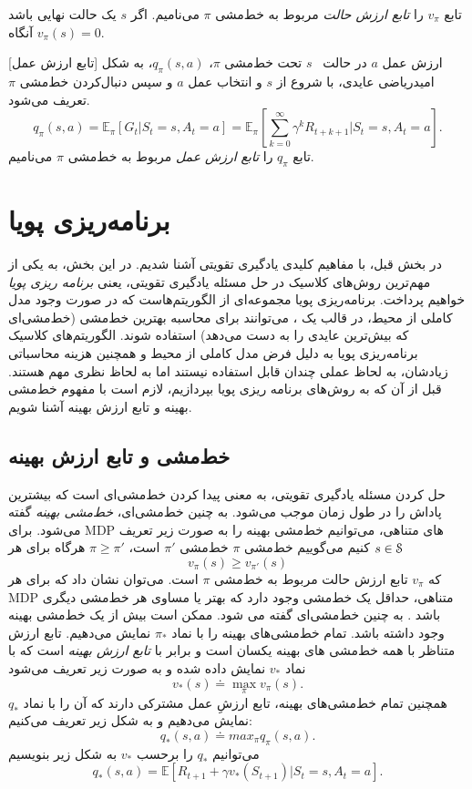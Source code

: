تابع $v_\pi$ را 
\textit{تابع ارزش حالت} مربوط به خط‌مشی 
$\pi$
می‌نامیم. اگر $s$ یک حالت نهایی باشد آنگاه 
$v_\pi(s) = 0$.


\label{statevaluedef}

[تابع ارزش عمل]
ارزش عمل  $a$ در حالت
\ $s$
 تحت خط‌مشی 
$\pi$،
$q_\pi(s,a)$،
  به شکل امیدریاضی عایدی، با شروع از $s$ و انتخاب عمل $a$  و سپس دنبال‌کردن خط‌مشی $\pi$ تعریف می‌شود.
$$q_\pi(s,a) = \mathbb{E}_\pi\left[G_t| S_t=s, A_t=a\right] = \mathbb{E}_\pi\left[\sum_{k=0}^{\infty} \gamma^k R_{t+k+1}|S_t =s, A_t=a \right].$$
تابع $q_\pi$ را 
\textit{تابع ارزش عمل}
 مربوط به خط‌مشی 
$\pi$
می‌نامیم.
\section{برنامه‌ریزی پویا}
در بخش قبل، با مفاهیم کلیدی یادگیری تقویتی آشنا شدیم. در این بخش، به یکی از مهم‌ترین روش‌های کلاسیک در حل مسئله یادگیری تقویتی، یعنی 
\textit{برنامه ریزی پویا}
خواهیم پرداخت. برنامه‌ریزی پویا
 مجموعه‌ای از الگوریتم‌هاست  که در صورت وجود مدل کاملی از محیط، در قالب یک 
،
 می‌توانند برای محاسبه بهترین خط‌مشی (خط‌مشی‌ای که بیش‌ترین عایدی را به دست می‌دهد) استفاده شوند.
الگوریتم‌های کلاسیک برنامه‌ریزی پویا به دلیل فرض
مدل کاملی از محیط و همچنین هزینه محاسباتی زیادشان، به لحاظ عملی چندان قابل استفاده نیستند اما به لحاظ نظری مهم هستند. قبل از آن که به روش‌های برنامه ریزی پویا بپردازیم، لازم است با مفهوم خط‌مشی بهینه و تابع ارزش بهینه آشنا شویم.
\subsection{خط‌مشی و تابع ارزش بهینه}
حل کردن مسئله یادگیری تقویتی، به معنی پیدا کردن خط‌مشی‌ای است که بیشترین پاداش را در طول زمان موجب می‌شود.	به چنین خط‌مشی‌ای، 
\textit{خط‌مشی بهینه} 
گفته می‌شود. برای
 MDP‌ 
 های متناهی، می‌توانیم خط‌مشی بهینه را به صورت زیر تعریف کنیم
می‌گوییم خط‌مشی $\pi$  خط‌مشی 
$\pi'$
است،
$\pi \ge \pi'$
هرگاه برای هر 
$s \in \EuScript{S}$
$$v_\pi(s) \ge v_{\pi'}(s)$$
که $v_\pi$ تابع ارزش حالت مربوط به خط‌مشی $\pi$ است.
 می‌توان نشان داد که برای هر MDP متناهی، حداقل یک خط‌مشی وجود دارد که بهتر یا مساوی هر خط‌مشی دیگری باشد
\cite{suttonbook}.
 به چنین خط‌مشی‌ای 
\textit{}
 گفته می‌ شود. ممکن است بیش از یک خط‌مشی بهینه وجود داشته باشد. تمام خط‌مشی‌های بهینه را با نماد $\pi_*$  نمایش می‌دهیم. تابع ارزش متناظر با همه خط‌مشی\nf
های بهینه یکسان است و برابر با 
\textit{تابع ارزش بهینه}
 است که با نماد $v_*$ نمایش داده شده و به صورت زیر تعریف می‌شود
$$v_*(s) \doteq \max_{\pi} v_\pi(s).$$
همچنین تمام خط‌مشی‌‌های بهینه، تابع ارزشِ عمل مشترکی دارند که آن را با نماد $q_*$ نمایش می‌دهیم و به شکل زیر تعریف می‌کنیم:
$$q_*(s,a) \doteq max_{\pi} q_\pi(s,a).$$
می‌توانیم $q_*$ را برحسب $v_*$ به شکل زیر بنویسیم \cite{suttonbook}
\begin{equation}
q_* (s,a) = \mathbb{E}[R_{t+1} + \gamma v_*(S_{t+1})| S_t=s, A_t=a].
\end{equation}

